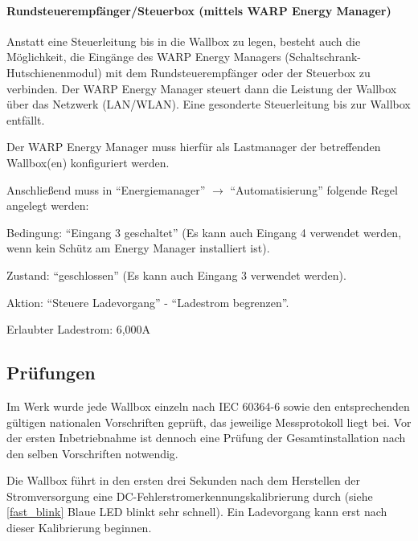 \documentclass[a4paper,10pt]{article}
\begin{document}
\begin{multicols*}{2}
    \paragraph*{Rundsteuerempfänger/Steuerbox (mittels WARP Energy Manager)}
    Anstatt eine Steuerleitung bis in die Wallbox zu legen, besteht auch die
    Möglichkeit, die Eingänge des WARP Energy Managers
    (Schaltschrank-Hutschienenmodul) mit dem Rundsteuerempfänger oder der
    Steuerbox zu verbinden. Der WARP Energy Manager steuert dann die
    Leistung der Wallbox über das Netzwerk (LAN/WLAN). Eine gesonderte
    Steuerleitung bis zur Wallbox entfällt.

    Der WARP Energy Manager muss hierfür als Lastmanager der betreffenden Wallbox(en) konfiguriert werden.

    Anschließend muss in \enquote{Energiemanager} $\rightarrow$ \enquote{Automatisierung}
    folgende Regel angelegt werden:

    \begin{description}
        \item{Bedingung:} \enquote{Eingang 3 geschaltet} (Es kann auch Eingang 4 verwendet werden, wenn kein Schütz am Energy Manager installiert ist).
        \item{Zustand:} \enquote{geschlossen} (Es kann auch Eingang 3 verwendet werden).
        \item{Aktion:} \enquote{Steuere Ladevorgang} - \enquote{Ladestrom begrenzen}.
        \item{Erlaubter Ladestrom:} 6,000A
    \end{description}


    \newpage
    \subsection{Prüfungen}\label{tests}
    Im Werk wurde jede Wallbox einzeln nach IEC 60364-6 sowie den entsprechenden gültigen
    nationalen Vorschriften geprüft, das jeweilige Messprotokoll liegt bei.
    Vor der ersten Inbetriebnahme ist dennoch eine Prüfung der Gesamtinstallation
    nach den selben Vorschriften notwendig.

    Die Wallbox führt in den ersten drei Sekunden nach dem Herstellen der Stromversorgung
    eine DC-Fehlerstromerkennungskalibrierung durch (siehe \ref{fast_blink} Blaue LED blinkt sehr schnell).
    Ein Ladevorgang kann erst nach dieser Kalibrierung beginnen.


\end{multicols*}
\end{document}
